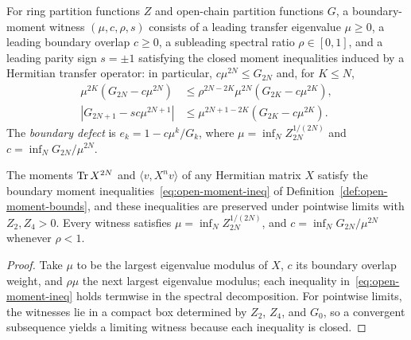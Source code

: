 \begin{definition}
  \label{def:open-moment-bounds}
  \leanok
  For ring partition functions \(Z\) and open-chain partition functions \(G\), a boundary-moment
  witness \((\mu, c, \rho, s)\) consists of a leading transfer eigenvalue \(\mu \ge 0\), a leading
  boundary overlap \(c \ge 0\), a subleading spectral ratio \(\rho \in [0, 1]\), and a leading
  parity sign \(s = \pm 1\) satisfying the closed moment inequalities induced by a Hermitian
  transfer operator: in particular, \(c\mu^{2N} \le G_{2N}\) and, for \(K \le N\),
  \begin{equation}
    \label{eq:open-moment-ineq}
    \begin{aligned}
      \mu^{2K}(G_{2N} - c\mu^{2N}) & \le \rho^{2N-2K}\mu^{2N}(G_{2K} - c\mu^{2K}), \\
      |G_{2N+1} - sc\mu^{2N+1}|    & \le \mu^{2N+1-2K}(G_{2K} - c\mu^{2K}).
    \end{aligned}
  \end{equation}
  The \emph{boundary defect} is \(e_k = 1 - c\mu^k/G_k\), where \(\mu = \inf_N Z_{2N}^{1/(2N)}\)
  and \(c = \inf_N G_{2N}/\mu^{2N}\).
\end{definition}

\begin{lemma}
  \label{lem:open-moment-bounds-limit}
  \leanok
  The moments \(\operatorname{Tr} X^{2N}\) and \(\langle v, X^n v\rangle\) of any Hermitian matrix \(X\) satisfy
  the boundary moment inequalities~\eqref{eq:open-moment-ineq} of
  Definition~\ref{def:open-moment-bounds}, and these inequalities are preserved under pointwise
  limits with \(Z_2, Z_4 > 0\). Every witness satisfies \(\mu = \inf_N Z_{2N}^{1/(2N)}\), and
  \(c = \inf_N G_{2N}/\mu^{2N}\) whenever \(\rho < 1\).
\end{lemma}
\begin{proof}
  \leanok
  Take \(\mu\) to be the largest eigenvalue modulus of \(X\), \(c\) its boundary overlap weight,
  and \(\rho\mu\) the next largest eigenvalue modulus; each inequality
  in~\eqref{eq:open-moment-ineq} holds termwise in the spectral decomposition. For pointwise
  limits, the witnesses lie in a compact box determined by \(Z_2\), \(Z_4\), and \(G_0\), so a
  convergent subsequence yields a limiting witness because each inequality is closed.
\end{proof}

